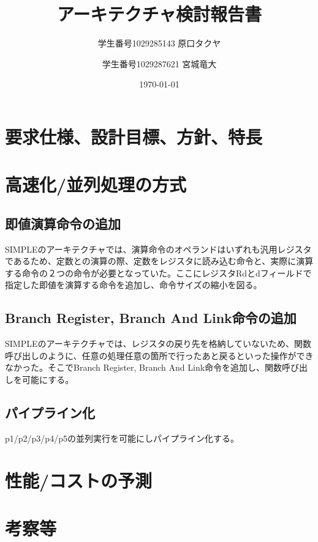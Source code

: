 \documentclass{jsreport}
\title{アーキテクチャ検討報告書}
\author{学生番号1029285143 原口タクヤ \and 学生番号1029287621 宮城竜大}
\date{\today}
\begin{document}
\begin{titlepage}
\maketitle
\end{titlepage}
\clearpage

\section{要求仕様、設計目標、方針、特長}

\section{高速化/並列処理の方式}
	\subsection{即値演算命令の追加}
        SIMPLEのアーキテクチャでは、演算命令のオペランドはいずれも汎用レジスタであるため、定数との演算の際、定数をレジスタに読み込む命令と、実際に演算する命令の２つの命令が必要となっていた。ここにレジスタRdとdフィールドで指定した即値を演算する命令を追加し、命令サイズの縮小を図る。
    
    \subsection{Branch Register, Branch And Link命令の追加}
    	SIMPLEのアーキテクチャでは、レジスタの戻り先を格納していないため、関数呼び出しのように、任意の処理任意の箇所で行ったあと戻るといった操作ができなかった。そこでBranch Register, Branch And Link命令を追加し、関数呼び出しを可能にする。
        
	\subsection{パイプライン化}
    	p1/p2/p3/p4/p5の並列実行を可能にしパイプライン化する。

\section{性能/コストの予測}
    
\section{考察等}
\end{document}
